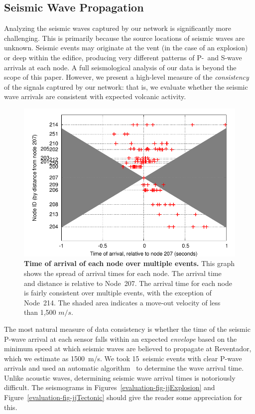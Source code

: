 \subsection{Seismic Wave Propagation}

Analyzing the seismic waves captured by our network is significantly more
challenging. This is primarily because the source locations of seismic waves
are unknown. Seismic events may originate at the vent (in the case of an
explosion) or deep within the edifice, producing very different patterns of
P-~and S-wave arrivals at each node. A full seismological analysis of our
data is beyond the scope of this paper. However, we present a high-level
measure of the \textit{consistency} of the signals captured by our network:
that is, we evaluate whether the seismic wave arrivals are consistent with
expected volcanic activity.

\begin{figure}[t]
\begin{center}
\includegraphics[width=0.8\hsize]{./3-evaluation/figs/fidelity/seismicArrival/arrivalTimesPlotScatteredNode.pdf}
\end{center}
\caption{\textbf{Time of arrival of each node over multiple events.}
This graph shows the spread of arrival times for each node. The arrival time
and distance is relative to Node~207. The arrival time for each node is
fairly consistent over multiple events, with the exception of Node~214.  The
shaded area indicates a move-out velocity of less than 1,500 $m/s$.}
\label{evaluation-fig-seismicArrivalScatteredNode}
\end{figure}

The most natural measure of data consistency is whether the time of the
seismic P-wave arrival at each sensor falls within an expected
\textit{envelope} based on the minimum speed at which seismic waves are
believed to propagate at Reventador, which we estimate as 1500~m/s. We took
15~seismic events with clear P-wave arrivals and used an automatic
algorithm~\cite{pwave-picking} to determine the wave arrival time. Unlike
acoustic waves, determining seismic wave arrival times is notoriously
difficult. The seismograms in Figures~\ref{evaluation-fig-jjExplosion} and
Figure~\ref{evaluation-fig-jjTectonic} should give the reader some
appreciation for this.


